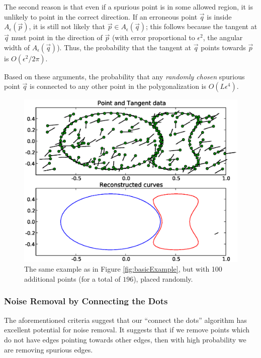 \documentclass{article}
\numberwithin{cntr}{section}
\numberwithin{equation}{section}
\newcommand{\vp}[0]{{\vec{p}}}
\newcommand{\vq}[0]{{\vec{q}}}
\newcommand{\allowed}[2]{ { A_{#1}(#2) } }
\begin{document}
The second reason is that even if a spurious point is in some allowed region, it is unlikely to point in the correct direction. If an erroneous point $\vq$ is inside $\allowed{\epsilon}{\vp}$, it is still not likely that $\vp \in \allowed{\epsilon}{\vq}$; this follows because the tangent at $\vq$ must point in the direction of $\vp$ (with error proportional to $\epsilon^{2}$, the angular width of $\allowed{\epsilon}{\vq}$). Thus, the probability that the tangent at $\vq$ points towards $\vp$ is $O(\epsilon^{2}/2\pi)$.

Based on these arguments, the probability that any \emph{randomly chosen} spurious point $\vq$ is connected to any other point in the polygonalization is $O(L \epsilon^{4})$.

\begin{figure}
\setlength{\unitlength}{0.240900pt}
\ifx\plotpoint\undefined\newsavebox{\plotpoint}\fi
\sbox{\plotpoint}{\rule[-0.200pt]{0.400pt}{0.400pt}}%
\includegraphics[scale=0.5]{noisy_example.eps}

\caption{The same example as in Figure \ref{fig:basicExample}, but with 100 additional points (for a total of $196$), placed randomly. }
\label{fig:noisyExample}
\end{figure}

\subsubsection{Noise Removal by Connecting the Dots}

The aforementioned criteria suggest that our ``connect the dots'' algorithm has excellent potential for noise removal. It suggests that if we remove points which do not have edges pointing towards other edges, then with high probability we are removing spurious edges.
\end{document}
